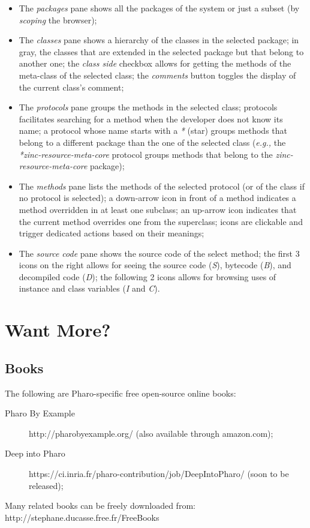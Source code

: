 \documentclass[notumble]{leaflet}
\newcommand{\eg}{\emph{e.g.,}\xspace}
\begin{document}
\begin{itemize}
\item The \emph{packages} pane shows all the packages of the system or
  just a subset (by \emph{scoping} the browser);
\item The \emph{classes} pane shows a hierarchy of the classes in the
  selected package; in gray, the classes that are extended in the
  selected package but that belong to another one; the \emph{class
    side} checkbox allows for getting the methods of the meta-class of
  the selected class; the \emph{comments} button toggles the display
  of the current class's comment;
\item The \emph{protocols} pane groups the methods in the selected
  class; protocols facilitates searching for a method when the
  developer does not know its name; a protocol whose name starts with a
  \emph{*} (star) groups methods that belong to a different package
  than the one of the selected class (\eg the
  \emph{*zinc-resource-meta-core} protocol groups methods that belong
  to the \emph{zinc-resource-meta-core} package);
\item The \emph{methods} pane lists the methods of the selected
  protocol (or of the class if no protocol is selected); a down-arrow
  icon in front of a method indicates a method overridden in at least
  one subclass; an up-arrow icon indicates that the current method
  overrides one from the superclass; icons are clickable and trigger
  dedicated actions based on their meanings;
\item The \emph{source code} pane shows the source code of the select
  method; the first 3 icons on the right allows for seeing the source
  code (\emph{S}), bytecode (\emph{B}), and decompiled code
  (\emph{D}); the following 2 icons allows for browsing uses of
  instance and class variables (\emph{I} and \emph{C}).
\end{itemize}

\section{Want More?}

\subsection{Books}

The following are Pharo-specific free open-source online books:

\begin{description}
\item[Pharo By Example] http://pharobyexample.org/ (also available
  through amazon.com);
\item[Deep into Pharo]
  https://ci.inria.fr/pharo-contribution/job/DeepIntoPharo/ (soon to
  be released);
\end{description}

Many related books can be freely downloaded from:\\[-1em]

\hspace{1em}http://stephane.ducasse.free.fr/FreeBooks
\end{document}
